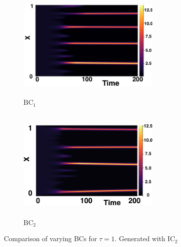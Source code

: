 \documentclass[12pt]{report}
\begin{document}
\begin{figure}[H]
    \centering
    \begin{subfigure}[b]{0.45\textwidth}
        \centering
        \includegraphics[width=7cm,height=5.5cm]{ic21.png}
        \caption{$\text{BC}_1$}
        \label{}
    \end{subfigure}
    \hfill
    \begin{subfigure}[b]{0.45\textwidth}
        \centering
        \includegraphics[width=7cm,height=5.5cm]{bc1.png}
        \caption{$\text{BC}_2$}
        \label{}
    \end{subfigure}
    \caption{Comparison of varying BCs for $\tau=1$. Generated with $\text{IC}_2$}
    \label{fig:bctau2}
\end{figure}
\end{document}
